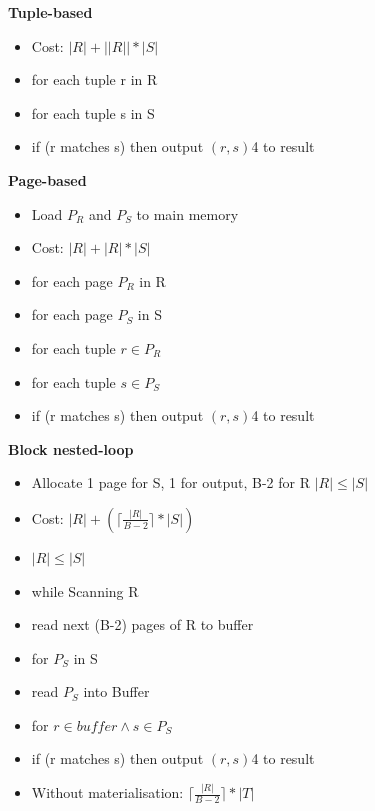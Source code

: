 \documentclass[10pt, landscape]{article}
\newcommand{\ceil}[1]{\lceil #1 \rceil}
\begin{document}
\begin{multicols}{4}
      \textbf{Tuple-based} \newline
      \begin{itemize}
        \item Cost: $|R| + ||R||*|S|$
        \item for each tuple r in R 
        \item for each tuple s in S 
        \item if (r matches s) then output $(r,s)$4 to result
      \end{itemize}

      \textbf{Page-based} \newline
      \begin{itemize}
        \item Load $P_R$ and $P_S$ to main memory
        \item Cost: $|R| + |R|*|S|$
        \item for each page $P_R$ in R 
        \item for each page $P_S$ in S
        \item for each tuple $r \in P_R$
        \item for each tuple $s \in P_S$ 
        \item if (r matches s) then output $(r,s)$4 to result
      \end{itemize}


      \textbf{Block nested-loop} \newline
      \begin{itemize}
        \item Allocate 1 page for S, 1 for output, B-2 for R $|R| \le |S|$
        \item Cost:  $|R| + (\ceil{\frac{|R|}{B-2}} * |S|)$
        \item $|R|\le |S|$
        \item while Scanning R
        \item read next (B-2) pages of R to buffer
        \item for $P_S$ in S
        \item read $P_S$ into Buffer
        \item for $r \in buffer \land s \in P_S$
        \item if (r matches s) then output $(r,s)$4 to result
        \item Without materialisation: $\ceil{\frac{|R|}{B-2}}*|T|$
      \end{itemize}


\end{multicols}
\end{document}
